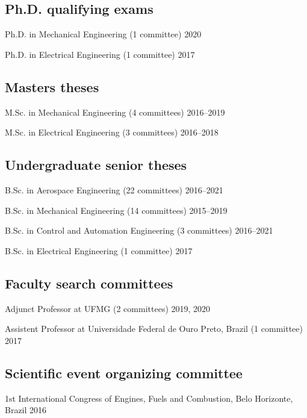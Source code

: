 \documentclass[a4paper, 11pt, oneside]{memoir}
\begin{document}
\subsection{Ph.D. qualifying exams}
\begin{shortdesc}
\item {Ph.D. in Mechanical Engineering (1 committee)} \hfill {2020}
\item {Ph.D. in Electrical Engineering (1 committee)} \hfill {2017}
\end{shortdesc}

\subsection{Masters theses}
\begin{shortdesc} 
\item {M.Sc. in Mechanical Engineering (4 committees)} \hfill {2016--2019}
\item {M.Sc. in Electrical Engineering (3 committees)} \hfill {2016--2018}
\end{shortdesc}

\subsection{Undergraduate senior theses}
\begin{shortdesc} 
\item {B.Sc. in Aerospace Engineering (22 committees)} \hfill {2016--2021}
\item {B.Sc. in Mechanical Engineering (14 committees)} \hfill {2015--2019}
\item {B.Sc. in Control and Automation Engineering (3 committees)} \hfill {2016--2021}
\item {B.Sc. in Electrical Engineering (1 committee)} \hfill {2017}
\end{shortdesc}
\subsection{Faculty search committees} 
\begin{shortdesc}
\item {Adjunct Professor at UFMG (2 committees)} \hfill {2019, 2020}
\item {%
  Assistent Professor at Universidade Federal de Ouro Preto, Brazil
  (1 committee)
}  \hfill {2017}
\end{shortdesc}

\subsection{Scientific event organizing committee}
\begin{shortdesc}
\item %
{1st International Congress of Engines, Fuels and Combustion,
 Belo Horizonte, Brazil} \hfill {2016}
\end{shortdesc}
\end{document}
